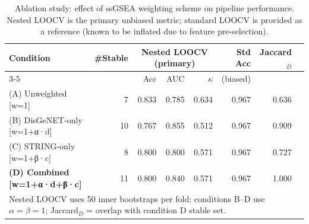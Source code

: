 \begin{table}[htbp]
\centering
\caption{Ablation study: effect of ssGSEA weighting scheme on pipeline performance. Nested LOOCV is the primary unbiased metric; standard LOOCV is provided as a reference (known to be inflated due to feature pre-selection).}
\label{tab:ablation}
\begin{tabular}{lrrrrrrl}
\toprule
Condition & \#Stable & \multicolumn{3}{c}{Nested LOOCV (primary)} & Std Acc & Jaccard$_D$ \\
\cmidrule(lr){3-5}
 & & Acc & AUC & $\kappa$ & (biased) & \\
\midrule
(A) Unweighted  [w=1] & 7 & 0.833 & 0.785 & 0.634 & 0.967 & 0.636 \\
(B) DisGeNET-only  [w=1+α·d] & 10 & 0.767 & 0.855 & 0.512 & 0.967 & 0.909 \\
(C) STRING-only  [w=1+β·c] & 8 & 0.800 & 0.800 & 0.571 & 0.967 & 0.727 \\
\textbf{(D) Combined  [w=1+α·d+β·c]} & 11 & 0.800 & 0.840 & 0.571 & 0.967 & 1.000 \\
\bottomrule
\multicolumn{8}{l}{\small Nested LOOCV uses 50 inner bootstraps per fold; conditions B--D use $\alpha=\beta=1$; Jaccard$_D$ = overlap with condition D stable set.} \\
\end{tabular}
\end{table}